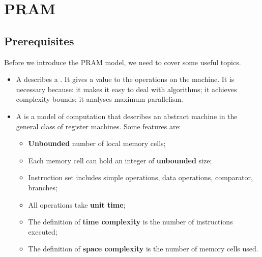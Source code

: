 \section{PRAM}

\subsection{Prerequisites}

Before we introduce the PRAM model, we need to cover some useful topics.
\begin{itemize}
    \item A  describes a . It gives a value to the operations on the machine. It is necessary because: it makes it easy to deal with algorithms; it achieves complexity bounds; it analyses maximum parallelism.

    \item A  is a model of computation that describes an abstract machine in the general class of register machines. Some features are:
    \begin{itemize}
        \item \textbf{Unbounded} number of local memory cells;
        \item Each memory cell can hold an integer of \textbf{unbounded} size;
        \item Instruction set includes simple operations, data operations, comparator, branches;
        \item All operations take \textbf{unit time};
        \item The definition of \textbf{time complexity} is the number of instructions executed;
        \item The definition of \textbf{space complexity} is the number of memory cells used.
    \end{itemize}
\end{itemize}